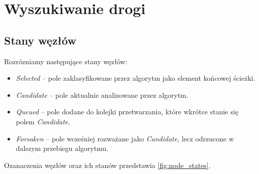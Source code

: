 \documentclass[../../doc.tex]{subfiles}
\begin{document}
\section{Wyszukiwanie drogi}


\subsection{Stany węzłów}

\label{sec:node_states}

Rozrózniamy następujące stany węzłów:

\begin{itemize}
  \item \textit{Selected} -- pole zaklasyfikowane przez algorytm jako element końcowej ścieżki.
  \item \textit{Candidate} -- pole aktualnie analizowane przez algorytm.
  \item \textit{Queued} -- pole dodane do kolejki przetwarzania, które wkrótce stanie się polem \textit{Candidate}.
  \item \textit{Forsaken} -- pole wcześniej rozważane jako \textit{Candidate}, lecz odrzucone w dalszym przebiegu algorytmu.
\end{itemize}


Ozanaczenia węzłów oraz ich stanów przedstawia \cref{fig:node_states}.
\end{document}

